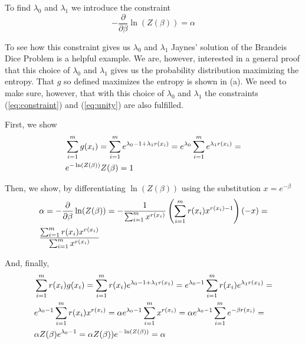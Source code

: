 \documentclass[11pt]{article}
\begin{document}
To find $\lambda_{0}$ and $\lambda_{1}$ we introduce the constraint
\begin{equation}
  \label{eq:logcon}
-\frac{\partial}{\partial{}\beta}\ln(Z(\beta))=\alpha
\end{equation}

To see how this constraint gives us $\lambda_{0}$ and $\lambda_{1}$
Jaynes' solution of the Brandeis Dice Problem is a helpful example. We
are, however, interested in a general proof that this choice of
$\lambda_{0}$ and $\lambda_{1}$ gives us the probability distribution
maximizing the entropy. That $g$ so defined maximizes the entropy is
shown in (a). We need to make sure, however, that with this choice of
$\lambda_{0}$ and $\lambda_{1}$ the constraints
({\ref{eq:constraint}}) and ({\ref{eq:unity}}) are also fulfilled.

First, we show
\begin{align}
&\sum_{i=1}^{m}g(x_{i})=\sum_{i=1}^{m}e^{\lambda_{0}-1+\lambda_{1}r(x_{i})}=e^{\lambda_{0}}\sum_{i=1}^{m}e^{\lambda_{1}r(x_{i})}=\notag\\
&e^{-\ln(Z(\beta))}Z(\beta)=1\label{eq:unishow}
\end{align}

Then, we show, by differentiating $\ln(Z(\beta))$ using the
substitution $x=e^{-\beta}$
\begin{align}
&\alpha=-\frac{\partial}{\partial{}\beta}\ln(Z(\beta))=-\frac{1}{\sum_{i=1}^{m}x^{r(x_{i})}}\left(\sum_{i=1}^{m}r(x_{i})x^{r(x_{i})-1}\right)(-x)=\notag\\
&\frac{\sum_{i=1}^{m}r(x_{i})x^{r(x_{i})}}{\sum_{i=1}^{m}x^{r(x_{i})}}\label{eq:alphashow}
\end{align}

And, finally,
\begin{align}
&\sum_{i=1}^{m}r(x_{i})g(x_{i})=\sum_{i=1}^{m}r(x_{i})e^{\lambda_{0}-1+\lambda_{1}r(x_{1})}=e^{\lambda_{0}-1}\sum_{i=1}^{m}r(x_{i})e^{\lambda_{1}r(x_{1})}=\notag\\
&e^{\lambda_{0}-1}\sum_{i=1}^{m}r(x_{i})x^{r(x_{i})}=\alpha{}e^{\lambda_{0}-1}\sum_{i=1}^{m}x^{r(x_{i})}=\alpha{}e^{\lambda_{0}-1}\sum_{i=1}^{m}e^{-\beta{}r(x_{i})}=\notag\\
&\alpha{}Z(\beta)e^{\lambda_{0}-1}=\alpha{}Z(\beta))e^{-\ln(Z(\beta))}=\alpha\label{eq:finalshow}
\end{align}
\end{document}
